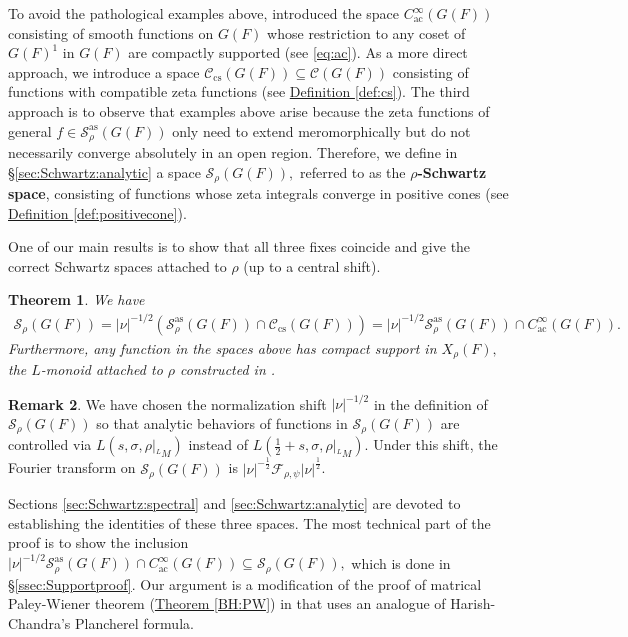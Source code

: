 \documentclass[10pt]{amsart}
\newtheorem{theorem}{Theorem}[section]
\theoremstyle{definition}
\newtheorem{remark}[theorem]{Remark}
\numberwithin{equation}{section}
\numberwithin{equation}{subsection}
\begin{document}
To avoid the pathological examples above, \cite{DRS} introduced the space $C^\infty_{\mathrm{ac}}(G(F))$ consisting of smooth functions on $G(F)$ whose restriction to any coset of $G(F)^1$ in $G(F)$ are compactly supported (see \eqref{eq:ac}). As a more direct approach, we introduce a space $\mathcal{C}_{\mathrm{cs}}(G(F))\subseteq \mathcal{C}(G(F))$ consisting of functions with compatible zeta functions (see \hyperref[def:cs]{Definition \ref{def:cs}}). The third approach is to observe that examples above arise because the zeta functions of general $f\in \mathcal{S}^{\mathrm{as}}_\rho(G(F))$ only need to extend meromorphically but do not necessarily converge absolutely in an open region. Therefore, we define in \S \ref{sec:Schwartz:analytic} a space $\mathcal{S}_\rho(G(F)),$ referred to as  the \textbf{$\rho$-Schwartz space},  consisting of functions whose zeta integrals converge in positive cones (see \hyperref[def:positivecone]{Definition \ref{def:positivecone}}).

One of our main results is to show that all three fixes coincide and give the correct Schwartz spaces attached to $\rho$ (up to a central shift).
\begin{theorem}\label{thm:main:compactsupport}
    We have
    \begin{align*}
        \mathcal{S}_\rho(G(F))=|\nu|^{-1/2}\left(\mathcal{S}_\rho^{\mathrm{as}}(G(F))\cap \mathcal{C}_{\mathrm{cs}}(G(F))\right)=|\nu|^{-1/2}\mathcal{S}_\rho^{\mathrm{as}}(G(F))\cap C^\infty_{\mathrm{ac}}(G(F)).
    \end{align*}
    Furthermore, any function in the spaces above has compact support in $X_{\rho}(F),$ the $L$-monoid attached to $\rho$ constructed in \cite[\S5]{Ngo:Hankel}.
\end{theorem}

\begin{remark}
    We have chosen the normalization shift $|\nu|^{-1/2}$ in the definition of $\mathcal{S}_\rho(G(F))$ so that analytic behaviors of functions in $\mathcal{S}_\rho(G(F))$ are controlled via $L(s,\sigma,\rho|_{{}^LM})$ instead of $L(\tfrac{1}{2}+s,\sigma,\rho|_{{}^LM}).$ Under this shift, the Fourier transform on $\mathcal{S}_\rho(G(F))$ is $|\nu|^{-\frac{1}{2}}\mathcal{F}_{\rho,\psi}|\nu|^{\frac{1}{2}}$.
\end{remark}

Sections \ref{sec:Schwartz:spectral} and  \ref{sec:Schwartz:analytic} are devoted to establishing the identities of these three spaces. The most technical part of the proof is to show the inclusion $|\nu|^{-1/2}\mathcal{S}_\rho^{\mathrm{as}}(G(F))\cap C^\infty_{\mathrm{ac}}(G(F))\subseteq \mathcal{S}_\rho(G(F)),$ which is done in \S \ref{ssec:Supportproof}. Our argument is a modification of the proof of matrical Paley-Wiener theorem (\hyperref[BH:PW]{Theorem \ref{BH:PW}}) in \cite{Heiermann:HeckePlan} that uses an analogue of Harish-Chandra's Plancherel formula. 
\end{document}
